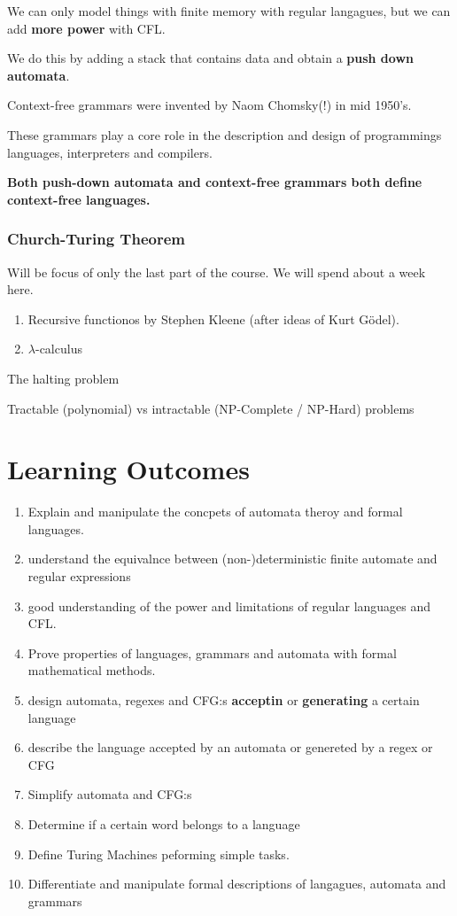 \documentclass{article}
\begin{document}
We can only model things with finite memory with regular langagues, but we can add \textbf{more power} with CFL.

We do this by adding a stack that contains data and obtain a \textbf{push down automata}.

Context-free grammars were invented by Naom Chomsky(!) in mid 1950's.

These grammars play a core role in the description and design of programmings languages, interpreters and compilers.

\textbf{Both push-down automata and context-free grammars both define context-free languages.}

\subsubsection{Church-Turing Theorem}

Will be focus of only the last part of the course. We will spend about a week here.

\begin{enumerate}
    \item Recursive functionos by Stephen Kleene (after ideas of Kurt Gödel).
    \item $\lambda$-calculus
\end{enumerate}

The halting problem

Tractable (polynomial) vs intractable (NP-Complete / NP-Hard) problems

\section{Learning Outcomes}

\begin{enumerate}
    \item Explain and manipulate the concpets of automata theroy and formal languages.
    \item understand the equivalnce between (non-)deterministic finite automate and regular expressions
    \item good understanding of the power and limitations of regular languages and CFL.
    \item Prove properties of languages, grammars and automata with formal mathematical methods.
    \item design automata, regexes and CFG:s \textbf{acceptin} or \textbf{generating} a certain language
    \item describe the language accepted by an automata or genereted by a regex or CFG
    \item  Simplify automata and CFG:s
    \item Determine if a certain word belongs to a language
    \item Define Turing Machines peforming simple tasks.
    \item Differentiate and manipulate formal descriptions of langagues, automata and grammars
\end{enumerate}
\end{document}
